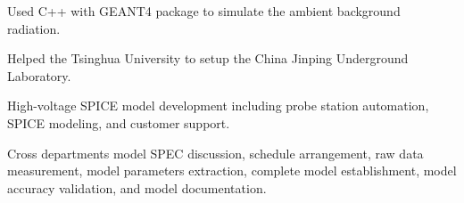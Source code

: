 \documentclass[letterpaper]{deedy-resume-openfont}
\begin{document}
\begin{tightemize}
\item Used C++ with GEANT4 package to simulate the ambient background radiation.
\item Helped the Tsinghua University to setup the China Jinping Underground Laboratory.
\end{tightemize}
\sectionsep

\begin{tightemize}
\item High-voltage SPICE model development including probe station automation, SPICE modeling, and customer support.
\item Cross departments model SPEC discussion, schedule arrangement, raw data measurement, model parameters extraction, complete model establishment, model accuracy validation, and model documentation.
\end{tightemize}
\sectionsep



\end{document}
